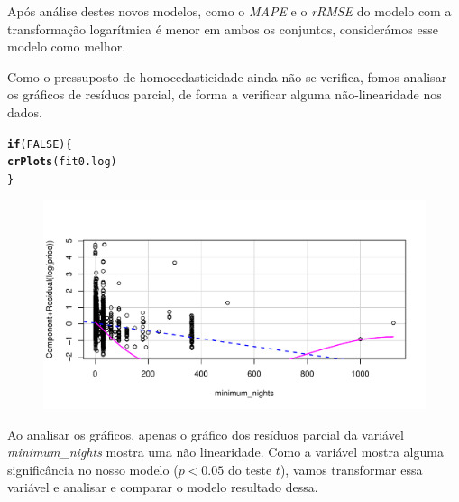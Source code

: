 \documentclass[justified, 11pt]{scrartcl}\usepackage[]{graphicx}\usepackage[]{xcolor}
\makeatletter
\def\maxwidth{ %
  \ifdim\Gin@nat@width>\linewidth
    \linewidth
  \else
    \Gin@nat@width
  \fi
}
\newcommand{\hlnum}[1]{\textcolor[rgb]{0.686,0.059,0.569}{#1}}%
\newcommand{\hlstd}[1]{\textcolor[rgb]{0.345,0.345,0.345}{#1}}%
\newcommand{\hlkwa}[1]{\textcolor[rgb]{0.161,0.373,0.58}{\textbf{#1}}}%
\newcommand{\hlkwd}[1]{\textcolor[rgb]{0.737,0.353,0.396}{\textbf{#1}}}%
\newenvironment{kframe}{%
 \def\at@end@of@kframe{}%
 \ifinner\ifhmode%
  \def\at@end@of@kframe{\end{minipage}}%
  \begin{minipage}{\columnwidth}%
 \fi\fi%
 \def\FrameCommand##1{\hskip\@totalleftmargin \hskip-\fboxsep
 \colorbox{shadecolor}{##1}\hskip-\fboxsep
     \hskip-\linewidth \hskip-\@totalleftmargin \hskip\columnwidth}%
 \MakeFramed {\advance\hsize-\width
   \@totalleftmargin\z@ \linewidth\hsize
   \@setminipage}}%
 {\par\unskip\endMakeFramed%
 \at@end@of@kframe}
\newenvironment{knitrout}{}{} %
\makeatother
\begin{document}
Após análise destes novos modelos, como o \textit{MAPE} e o \textit{rRMSE} do modelo com a transformação logarítmica é menor em ambos os conjuntos, considerámos esse modelo como melhor.

Como o pressuposto de homocedasticidade ainda não se verifica, fomos analisar os gráficos de resíduos parcial, de forma a verificar alguma não-linearidade nos dados.\\

\begin{knitrout}
\color{fgcolor}\begin{kframe}
\begin{alltt}
\hlkwa{if} \hlstd{(}\hlnum{FALSE}\hlstd{) \{}
  \hlkwd{crPlots}\hlstd{(fit0.log)}
\hlstd{\}}
\end{alltt}
\end{kframe}
\end{knitrout}
\begin{figure}
  \includegraphics[width=\maxwidth]{figure/manual-chunk-crPlots}
\end{figure}
Ao analisar os gráficos, apenas o gráfico dos resíduos parcial da variável \textit{minimum\_nights} mostra uma não linearidade. Como a variável mostra alguma significância no nosso modelo ($p < 0.05$ do teste $t$), vamos transformar essa variável e analisar e comparar o modelo resultado dessa.
\end{document}
